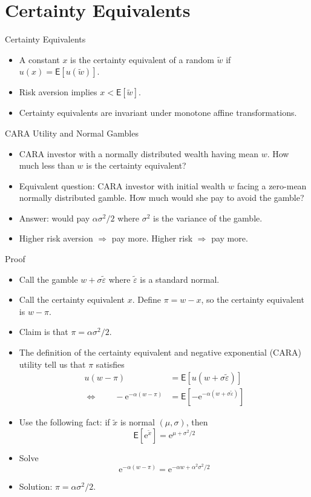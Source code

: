 \documentclass[10pt]{beamer}
\newcommand{\bi}{\begin{itemize}}
\newcommand{\ei}{\end{itemize}}
\newcommand{\im}{\item}
\newcommand{\E}{\mathrm{e}}
\newcommand{\mye}{\ensuremath{\mathsf{E}}}
\newcommand{\tve}{\tilde{\varepsilon}}
\begin{document}
\section{Certainty Equivalents}

\begin{frame}{Certainty Equivalents}
  \bi
  \im A constant $x$ is the certainty equivalent of a random $\tilde{w}$ if $u(x) = \mye[u(\tilde{w})]$.  
\im Risk aversion implies $x<\mye[\tilde{w}]$.
\im Certainty equivalents are invariant under monotone affine transformations.
\ei
\end{frame}

\begin{frame}{CARA Utility and Normal Gambles}
  \bi
  \im CARA investor with a normally distributed wealth having mean $w$. How much less than $w$ is the certainty equivalent?
  \im Equivalent question: CARA investor with initial wealth $w$ facing a \alert{zero-mean} normally distributed gamble.  How much would she pay to avoid the gamble?
  \im Answer: would pay $\alpha \sigma^2/2$ where $\sigma^2$ is the variance of the gamble.
  \im Higher risk aversion $\Rightarrow$ pay more.  Higher risk $\Rightarrow$ pay more.
  \ei
\end{frame}

\begin{frame}{Proof}
  \bi
   \im Call the gamble $w + \sigma \tve$ where $\tve$ is a standard normal.
   \im Call the certainty equivalent $x$.  Define $\pi = w-x$, so the certainty equivalent is $w-\pi$.
   \im Claim is that $\pi = \alpha\sigma^2/2$.
   \pause
   \im The definition of the certainty equivalent and negative exponential (CARA) utility tell us that $\pi$ satisfies
  \begin{align*}
  u(w-\pi) &= \mye\left[u(w+\sigma\tilde{\varepsilon})\right] \\
   \Leftrightarrow \qquad -\E^{-\alpha(w-\pi)} &= \mye\left[-\E^{-\alpha(w+\sigma\tilde{\varepsilon})}\right]
  \end{align*} 
  \ei
\end{frame} 

\begin{frame}[plain]
  \bi
  \im Use the following fact: if $\tilde{x}$ is normal $(\mu,\sigma)$, then 
  $$\mye\left[\E^{\tilde{x}}\right] = \E^{\mu + \sigma^2/2}$$
  \pause
  \im Solve
  $$\E^{-\alpha(w-\pi)} = \E^{-\alpha w+ \alpha^2\sigma^2/2}$$
  \pause
  \im Solution: $\pi = \alpha\sigma^2/2$.
  \ei
  \end{frame}
\end{document}
